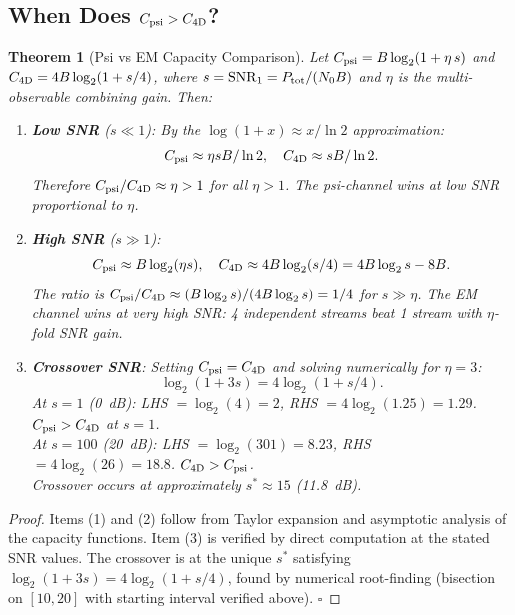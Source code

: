 \documentclass[aps,prd,twocolumn,superscriptaddress,nofootinbib]{revtex4-2}
\newcommand{\SNR}{\mathrm{SNR}}
\newtheorem{theorem}{Theorem}
\begin{document}
\subsection{When Does $C_{\rm psi} > C_{\rm 4D}$?}

\begin{theorem}[Psi vs EM Capacity Comparison]
\label{thm:cap-compare}
Let $C_{\rm psi} = B\log_2(1 + \eta\,s)$ and
$C_{\rm 4D} = 4B\log_2(1 + s/4)$, where $s = \SNR_1 = P_{\rm tot}/(N_0 B)$
and $\eta$ is the multi-observable combining gain. Then:
\begin{enumerate}
\item \textbf{Low SNR} ($s \ll 1$): By the $\log(1+x)\approx x/\ln 2$
  approximation:
  \begin{equation}
  C_{\rm psi} \approx \eta s B/\ln 2, \quad
  C_{\rm 4D} \approx s B/\ln 2.
  \end{equation}
  Therefore $C_{\rm psi}/C_{\rm 4D} \approx \eta > 1$ for all $\eta > 1$.
  \emph{The psi-channel wins at low SNR proportional to $\eta$}.

\item \textbf{High SNR} ($s \gg 1$):
  \begin{equation}
  C_{\rm psi} \approx B\log_2(\eta s), \quad
  C_{\rm 4D} \approx 4B\log_2(s/4) = 4B\log_2 s - 8B.
  \end{equation}
  The ratio is $C_{\rm psi}/C_{\rm 4D} \approx (B\log_2 s)/(4B\log_2 s)
  = 1/4$ for $s \gg \eta$.
  \emph{The EM channel wins at very high SNR: 4 independent streams beat
  1 stream with $\eta$-fold SNR gain}.

\item \textbf{Crossover SNR}: Setting $C_{\rm psi} = C_{\rm 4D}$ and
  solving numerically for $\eta = 3$:
  \begin{equation}
  \log_2(1 + 3s) = 4\log_2(1 + s/4).
  \end{equation}
  At $s = 1$ (0~dB): LHS $= \log_2(4) = 2$, RHS $= 4\log_2(1.25) = 1.29$.
  $C_{\rm psi} > C_{\rm 4D}$ at $s=1$. \\
  At $s = 100$ (20~dB): LHS $= \log_2(301) = 8.23$,
  RHS $= 4\log_2(26) = 18.8$. $C_{\rm 4D} > C_{\rm psi}$.\\
  Crossover occurs at approximately $s^* \approx 15$ (11.8~dB).
\end{enumerate}
\end{theorem}

\begin{proof}
Items (1) and (2) follow from Taylor expansion and asymptotic analysis
of the capacity functions. Item (3) is verified by direct computation at
the stated SNR values. The crossover is at the unique $s^*$ satisfying
$\log_2(1+3s) = 4\log_2(1+s/4)$, found by numerical root-finding
(bisection on $[10, 20]$ with starting interval verified above). $\square$
\end{proof}
\end{document}
